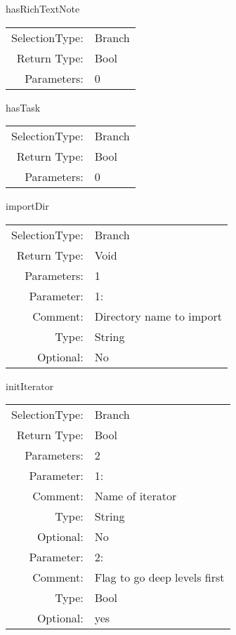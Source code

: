 \item hasRichTextNote\\
\begin{tabular}{rl}
  SelectionType: & Branch\\
    Return Type: & Bool\\
     Parameters: & 0\\
\end{tabular}

\item hasTask\\
\begin{tabular}{rl}
  SelectionType: & Branch\\
    Return Type: & Bool\\
     Parameters: & 0\\
\end{tabular}

\item importDir\\
\begin{tabular}{rl}
  SelectionType: & Branch\\
    Return Type: & Void\\
     Parameters: & 1\\
   Parameter: &  1:\\
        Comment: & Directory name to import\\
           Type: & String\\
       Optional: &  No\\
\end{tabular}

\item initIterator\\
\begin{tabular}{rl}
  SelectionType: & Branch\\
    Return Type: & Bool\\
     Parameters: & 2\\
   Parameter: &  1:\\
        Comment: & Name of iterator\\
           Type: & String\\
       Optional: &  No\\
   Parameter: &  2:\\
        Comment: & Flag to go deep levels first\\
           Type: & Bool\\
       Optional: &  yes\\
\end{tabular}

